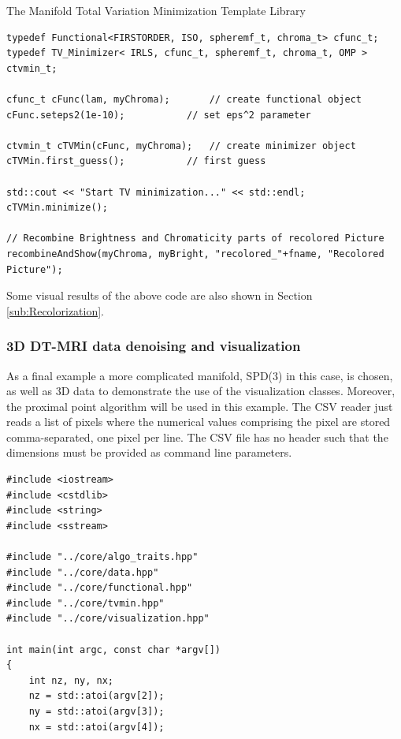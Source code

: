 \begin{chapter}{The Manifold Total Variation Minimization Template Library}
\cppinline
\begin{lstlisting}[label=code:tut2_functionalmin,caption={Functional and minimizer definition, first guess and minimization}]
typedef Functional<FIRSTORDER, ISO, spheremf_t, chroma_t> cfunc_t;
typedef TV_Minimizer< IRLS, cfunc_t, spheremf_t, chroma_t, OMP > ctvmin_t;

cfunc_t cFunc(lam, myChroma);	    // create functional object
cFunc.seteps2(1e-10);		    // set eps^2 parameter

ctvmin_t cTVMin(cFunc, myChroma);   // create minimizer object
cTVMin.first_guess();		    // first guess

std::cout << "Start TV minimization..." << std::endl;
cTVMin.minimize();		    

// Recombine Brightness and Chromaticity parts of recolored Picture
recombineAndShow(myChroma, myBright, "recolored_"+fname, "Recolored Picture");
\end{lstlisting}

Some visual results of the above code are also shown in Section \ref{sub:Recolorization}.




\subsubsection{3D DT-MRI data denoising and visualization} %
\label{ssub:dti_tut}
As a final example a more complicated manifold, SPD(3) in this case, is chosen, as well as 3D data to demonstrate the use of the visualization classes. Moreover, the proximal point algorithm will be used in this example. The CSV reader just reads a list of pixels where the numerical values comprising the pixel are stored comma-separated, one pixel
per line. The CSV file has no header such that the dimensions must be provided as command line parameters.

\cppinline
\begin{lstlisting}[label=code:tut3_init,caption={Initialization}]
#include <iostream>
#include <cstdlib>
#include <string>
#include <sstream>

#include "../core/algo_traits.hpp"
#include "../core/data.hpp"
#include "../core/functional.hpp"
#include "../core/tvmin.hpp"
#include "../core/visualization.hpp"

int main(int argc, const char *argv[])
{       
    int nz, ny, nx;
    nz = std::atoi(argv[2]);
    ny = std::atoi(argv[3]);
    nx = std::atoi(argv[4]);


\end{lstlisting}
\end{chapter}
